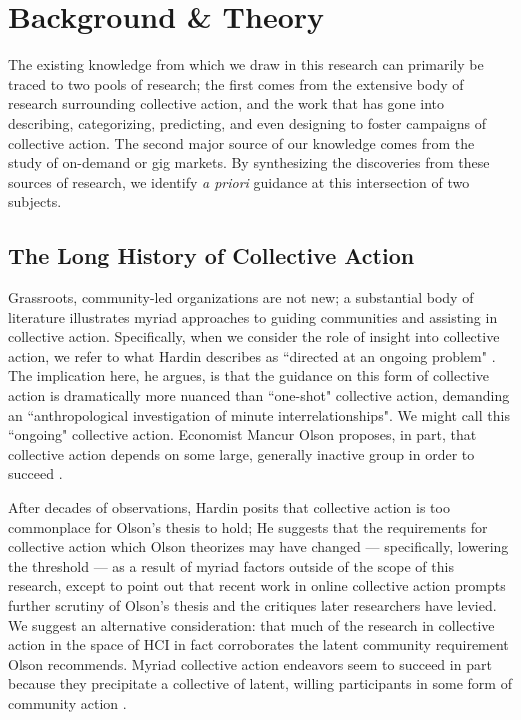 \section{Background \& Theory}

The existing knowledge from which we draw in this research can primarily be traced to two pools of research;
the first comes from the extensive body of research surrounding collective action,
and the work that has gone into describing, categorizing, predicting, and even designing to foster campaigns of collective action.
The second major source of our knowledge comes from the study of on-demand or gig markets.
By synthesizing the discoveries from these sources of research, we identify \textit{a priori} guidance at this intersection of two subjects.

\subsection{The Long History of Collective Action}
Grassroots, community-led organizations are not new;
a substantial body of literature illustrates myriad approaches to guiding communities and assisting in collective action.
Specifically, when we consider the role of insight into collective action, we refer to what Hardin describes as ``directed at an ongoing problem"
\cite{russell1982collective}.
The implication here, he argues, is that the guidance on this form of collective action is dramatically more nuanced than ``one-shot" collective action, demanding an ``anthropological investigation of minute interrelationships".
We might call this ``ongoing" collective action.
Economist Mancur Olson proposes, in part, that collective action depends on some large, generally inactive group in order to succeed
\cite{olsonlogic}.

After decades of observations, Hardin posits that collective action is too commonplace for Olson's thesis to hold;
He suggests that the requirements for collective action which Olson theorizes may have changed
--- specifically, lowering the threshold ---
as a result of myriad factors outside of the scope of this research, except to point out that recent work in online collective action prompts further scrutiny of Olson's thesis and the critiques later researchers have levied.
We suggest an alternative consideration: that much of the research in collective action in the space of HCI in fact corroborates the latent community requirement Olson recommends.
Myriad collective action endeavors seem to succeed in part because they precipitate a collective of latent, willing participants in some form of community action
\cite{catalyst,dynamo,foundry}.

